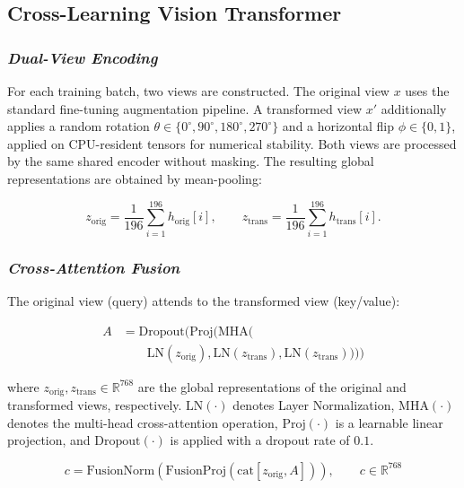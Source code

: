 \documentclass[conference]{IEEEtran}
\begin{document}
\subsection{Cross-Learning Vision Transformer}

\subsubsection{\textit{\textbf{Dual-View Encoding}}}
For each training batch, two views are constructed. The original
view $x$ uses the standard fine-tuning augmentation pipeline.
A transformed view $x'$ additionally applies a random rotation
$\theta \in \{0^\circ, 90^\circ, 180^\circ, 270^\circ\}$ and a
horizontal flip $\phi \in \{0,1\}$, applied on CPU-resident tensors
for numerical stability. Both views are processed by the same shared
encoder without masking. The resulting global representations are
obtained by mean-pooling:

\begin{equation}
z_{\mathrm{orig}}=
\frac{1}{196}
\sum_{i=1}^{196}
h_{\mathrm{orig}}[i],
\qquad
z_{\mathrm{trans}}=
\frac{1}{196}
\sum_{i=1}^{196}
h_{\mathrm{trans}}[i].
\end{equation}

\subsubsection{\textit{\textbf{Cross-Attention Fusion}}}

The original view (query) attends to the transformed view (key/value):

\begin{equation}
\begin{aligned}
A
&=
\mathrm{Dropout}\Big(
\mathrm{Proj}\big(
\mathrm{MHA}( \\
&\qquad
\mathrm{LN}(z_{\mathrm{orig}}),
\mathrm{LN}(z_{\mathrm{trans}}),
\mathrm{LN}(z_{\mathrm{trans}})
)
\big)
\Big)
\end{aligned}
\end{equation}

where $z_{\mathrm{orig}}, z_{\mathrm{trans}} \in \mathbb{R}^{768}$ are the global representations of the original and transformed views, respectively. $\mathrm{LN}(\cdot)$ denotes Layer Normalization, $\mathrm{MHA}(\cdot)$ denotes the multi-head cross-attention operation, $\mathrm{Proj}(\cdot)$ is a learnable linear projection, and $\mathrm{Dropout}(\cdot)$ is applied with a dropout rate of $0.1$.

\begin{equation}
c=\mathrm{FusionNorm}\!\left(
\mathrm{FusionProj}
\left(
\mathrm{cat}\left[z_{\mathrm{orig}},A\right]
\right)
\right),
\qquad
c\in\mathbb{R}^{768}
\end{equation}
\end{document}
